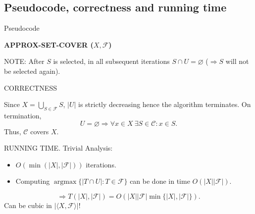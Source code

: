 \subsection{Pseudocode, correctness and running time}
Pseudocode
\begin{notesalgorithm}
\textbf{APPROX-SET-COVER ($X,\mathcal F$)}
\begin{notespseudocode}
\end{notespseudocode}
\end{notesalgorithm}
NOTE: After $S$ is selected, in all subsequent iterations $S\cap U=\varnothing$ ($\Rightarrow S$ will not be selected again).

CORRECTNESS

Since $X=\bigcup_{S\in\mathcal F}S$, $|U|$ is strictly decreasing hence the algorithm terminates. On termination,
\[U=\varnothing\Rightarrow\forall x\in X\ \exists S\in\mathcal C:x\in S.\]
Thus, $\mathcal C$ covers $X$.

RUNNING TIME. Trivial Analysis:
\begin{itemize}
\item $O(\min(|X|,|\mathcal F|))$ iterations.
\item Computing $\operatorname{argmax}\{|T\cap U|:T\in\mathcal F\}$ can be done in time $O(|X||\mathcal F|)$.
\end{itemize}
\[\Rightarrow T(|X|,|\mathcal F|)=O(|X||\mathcal F|\min\{|X|,|\mathcal F|\}).\]
Can be cubic in $|\langle X,\mathcal F\rangle|$!
